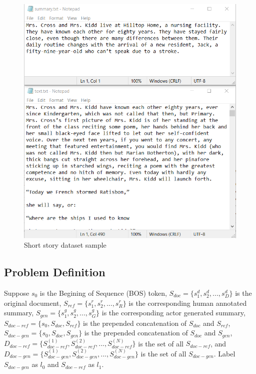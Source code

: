 \documentclass[11pt,a4paper]{article}
\begin{document}
\begin{figure}[h!]
  \includegraphics[scale=0.5]{short_story_data.png}
  \caption{Short story dataset sample}
  \label{fig:Short story Dataset Sample}
\end{figure}

\subsection{Problem Definition}
Suppose $s_0$ is the Begining of Sequence (BOS) token, $S_{doc} = \{s_1^d, s_2^d, ..., s_D^d\}$ is the original document, $S_{ref} = \{s_1^r, s_2^r, ..., s_R^r\}$ is the corresponding human annotated summary, $S_{gen} = \{s_1^g, s_2^g, ..., s_G^g\}$ is the corresponding actor generated summary, $S_{doc-ref}=\{s_0, S_{doc}, S_{ref}\}$ is the prepended concatenation of $S_{doc}$ and $S_{ref}$, $S_{doc-gen}=\{s_0, S_{doc}, S_{gen}\}$ is the prepended concatenation of $S_{doc}$ and $S_{gen}$, $D_{doc-ref}=\{S_{doc-ref}^{(1)}, S_{doc-ref}^{(2)}, ..., S_{doc-ref}^{(N)}\}$ is the set of all $S_{doc-ref}$, and $D_{doc-gen}=\{S_{doc-gen}^{(1)}, S_{doc-gen}^{(2)}, ..., S_{doc-gen}^{(N)}\}$ is the set of all $S_{doc-gen}$. Label $S_{doc-gen}$ as $l_0$ and $S_{doc-ref}$ as $l_1$.
\end{document}
